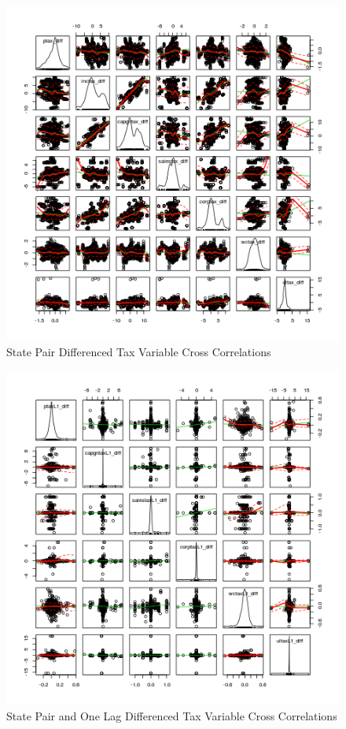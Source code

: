 \documentclass[12pt,a4paper]{article}
\begin{document}


\begin{figure}[h]\label{pairs}
    \centering
    \caption{State Pair Differenced Tax Variable Cross Correlations}
    \includegraphics[scale = 0.5]{../analysis/output/_--_pairs.png}
\end{figure}

\begin{figure}[h]\label{pairsL1}
\centering
\caption{State Pair and One Lag Differenced Tax Variable Cross Correlations}
\includegraphics[scale=0.5]{../analysis/output/_--_pairsL1.png}
\end{figure}
\end{document}
